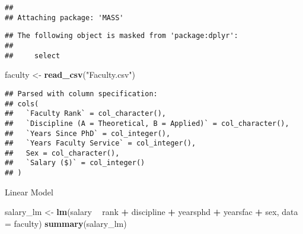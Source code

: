 \documentclass[]{article}
\newenvironment{Shaded}{\begin{snugshade}}{\end{snugshade}}
\newcommand{\KeywordTok}[1]{\textcolor[rgb]{0.13,0.29,0.53}{\textbf{#1}}}
\newcommand{\DataTypeTok}[1]{\textcolor[rgb]{0.13,0.29,0.53}{#1}}
\newcommand{\StringTok}[1]{\textcolor[rgb]{0.31,0.60,0.02}{#1}}
\newcommand{\OperatorTok}[1]{\textcolor[rgb]{0.81,0.36,0.00}{\textbf{#1}}}
\newcommand{\NormalTok}[1]{#1}
\begin{document}
\begin{verbatim}
## 
## Attaching package: 'MASS'
\end{verbatim}

\begin{verbatim}
## The following object is masked from 'package:dplyr':
## 
##     select
\end{verbatim}

\begin{Shaded}
\begin{Highlighting}[]
\NormalTok{faculty <-}\StringTok{ }\KeywordTok{read_csv}\NormalTok{(}\StringTok{"Faculty.csv"}\NormalTok{)}
\end{Highlighting}
\end{Shaded}

\begin{verbatim}
## Parsed with column specification:
## cols(
##   `Faculty Rank` = col_character(),
##   `Discipline (A = Theoretical, B = Applied)` = col_character(),
##   `Years Since PhD` = col_integer(),
##   `Years Faculty Service` = col_integer(),
##   Sex = col_character(),
##   `Salary ($)` = col_integer()
## )
\end{verbatim}

\begin{Shaded}
\end{Shaded}

Linear Model

\begin{Shaded}
\begin{Highlighting}[]
\NormalTok{salary_lm <-}\StringTok{ }\KeywordTok{lm}\NormalTok{(salary }\OperatorTok{~}\StringTok{ }\NormalTok{rank }\OperatorTok{+}\StringTok{ }\NormalTok{discipline }\OperatorTok{+}\StringTok{ }\NormalTok{yearsphd }\OperatorTok{+}\StringTok{ }\NormalTok{yearsfac }\OperatorTok{+}\StringTok{ }\NormalTok{sex, }\DataTypeTok{data =}\NormalTok{ faculty)}
\KeywordTok{summary}\NormalTok{(salary_lm)}
\end{Highlighting}
\end{Shaded}
\end{document}
